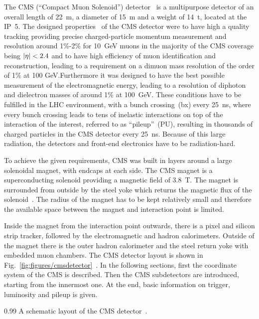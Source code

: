 The CMS (``Compact Muon Solenoid'') detector~\cite{Chatrchyan:2008aa} is a multipurpose detector of an overall length of 22~m, a diameter of 15~m and a weight of 14~t, located at the IP~5. The designed properties~\cite{CMSproposal} of the CMS  detector were to have high a quality tracking providing precise charged-particle momentum measurement and resolution around 1\%-2\% for 10~GeV muons in the majority of the CMS coverage being $\abs{\eta}<2.4$ and to have high efficiency of muon identification and reconstruction, leading to a requirement on  a dimuon mass resolution of the order of 1\% at 100 GeV.Furthermore it was designed to have the best possible measurement of the electromagnetic energy, leading to a resolution of diphoton and dielectron masses of around 1\% at 100~GeV. These conditions have to be fulfilled in the LHC environment, with a bunch crossing~(bx) every 25~ns, where every bunch crossing leads to tens of inelastic interactions on top of the interaction of the interest, referred to as ``pileup''~(PU), resulting in thousands of charged particles in the CMS detector every 25~ns. Because of this large radiation, the detectors and front-end electronics have to be radiation-hard.

To achieve the given requirements, CMS was built in layers around a large solenoidal magnet, with endcaps at each side. The CMS magnet is a superconducting solenoid providing a magnetic field of 3.8~T. The magnet is surrounded from outside by the steel yoke which returns the magnetic flux of the solenoid~\cite{tdrMagnet}. The radius of the magnet has to be kept relatively small and therefore the available space between the magnet and interaction point is limited.

Inside the magnet from the interaction point outwards, there is a pixel and silicon strip tracker, followed by the electromagnetic and hadron calorimeters. Outside of the magnet there is the outer hadron calorimeter and the steel return yoke with embedded muon chambers. The CMS detector layout is shown in Fig.~\ref{fig:figures/cmsdetector}~\cite{website:CMSdet}. In the following sections, first the coordinate system of the CMS is described. Then the CMS subdetectors are introduced, starting from the innermost one. At the end, basic information on trigger, luminosity and pileup is given.


                 {0.99}       %
                 { A schematic layout of the CMS detector~\cite{website:CMSdet}. }

